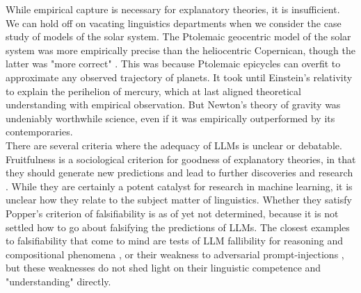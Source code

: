 While empirical capture is necessary for explanatory theories, it is insufficient. We can hold off on vacating linguistics departments when we consider the case study of models of the solar system. The Ptolemaic geocentric model of the solar system was more empirically precise than the heliocentric Copernican, though the latter was "more correct" \citep{}. This was because Ptolemaic epicycles can overfit to approximate any observed trajectory of planets. It took until Einstein's relativity to explain the perihelion of mercury, which at last aligned theoretical understanding with empirical observation. But Newton's theory of gravity was undeniably worthwhile science, even if it was empirically outperformed by its contemporaries.\\

There are several criteria where the adequacy of LLMs is unclear or debatable. Fruitfulness is a sociological criterion for goodness of explanatory theories, in that they should generate new predictions and lead to further discoveries and research \citep{}. While they are certainly a potent catalyst for research in machine learning, it is unclear how they relate to the subject matter of linguistics. Whether they satisfy Popper's criterion of falsifiability is as of yet not determined, because it is not settled how to go about falsifying the predictions of LLMs. The closest examples to falsifiability that come to mind are tests of LLM fallibility for reasoning and compositional phenomena \citep{}, or their weakness to adversarial prompt-injections \citep{}, but these weaknesses do not shed light on their linguistic competence and "understanding" directly.\\


